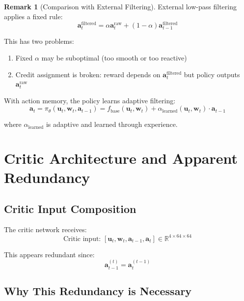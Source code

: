 \documentclass[11pt,a4paper]{article}
\newcommand{\R}{\mathbb{R}}
\theoremstyle{definition}
\newtheorem{remark}{Remark}
\begin{document}
\begin{remark}[Comparison with External Filtering]
External low-pass filtering applies a fixed rule:
\begin{equation}
    \mathbf{a}_t^{\text{filtered}} = \alpha \mathbf{a}_t^{\text{raw}} + (1-\alpha) \mathbf{a}_{t-1}^{\text{filtered}}
\end{equation}

This has two problems:
\begin{enumerate}
    \item Fixed $\alpha$ may be suboptimal (too smooth or too reactive)
    \item Credit assignment is broken: reward depends on $\mathbf{a}_t^{\text{filtered}}$ but policy outputs $\mathbf{a}_t^{\text{raw}}$
\end{enumerate}

With action memory, the policy learns adaptive filtering:
\begin{equation}
    \mathbf{a}_t = \pi_\theta(\mathbf{u}_t, \mathbf{w}_t, \mathbf{a}_{t-1}) = f_{\text{base}}(\mathbf{u}_t, \mathbf{w}_t) + \alpha_{\text{learned}}(\mathbf{u}_t, \mathbf{w}_t) \cdot \mathbf{a}_{t-1}
\end{equation}

where $\alpha_{\text{learned}}$ is adaptive and learned through experience.
\end{remark}

\section{Critic Architecture and Apparent Redundancy}

\subsection{Critic Input Composition}

The critic network receives:
\begin{equation}
    \text{Critic input: } [\mathbf{u}_t, \mathbf{w}_t, \mathbf{a}_{t-1}, \mathbf{a}_t] \in \R^{4 \times 64 \times 64}
\end{equation}

This appears redundant since:
\begin{equation}
    \mathbf{a}_{t-1}^{(t)} = \mathbf{a}_t^{(t-1)}
\end{equation}

\subsection{Why This Redundancy is Necessary}
\end{document}
